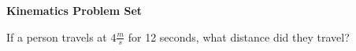 \documentclass{exam}
\begin{document}
    \vspace*{-25px}
    \begin{center}
        \huge \textbf{Kinematics Problem Set}
    \end{center}
    \vspace*{0.05in}
    \begin{questions}
        \large
        \question If a person travels at $4 \frac{m}{s}$ for 12 seconds, what distance did they travel?
        
    \end{questions}
\end{document}
